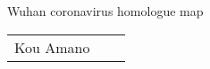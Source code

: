 \documentclass[portrait,a0,oldgerm]{a0poster}
\def\areaspace{9.4mm}
\begin{document}


\begin{center}
\end{center}
\begin{center}
\color[cmyk]{0,1,1,0.7}
\linespread{5.0}\fontsize{90}{20}\selectfont
Wuhan coronavirus homologue map
\end{center}
\color[cmyk]{0,1,1,0.8}
\linespread{1.4}\fontsize{50}{20}\selectfont
\begin{center} \begin{tabular}[t]{ccc}
Kou Amano \\
\end{tabular} \end{center}
\color[cmyk]{0,1,1,0.85}
\linespread{1.4}\fontsize{48}{20}\selectfont
\begin{center} \begin{tabular}{c} 
\end{tabular} \end{center}




\end{document}
